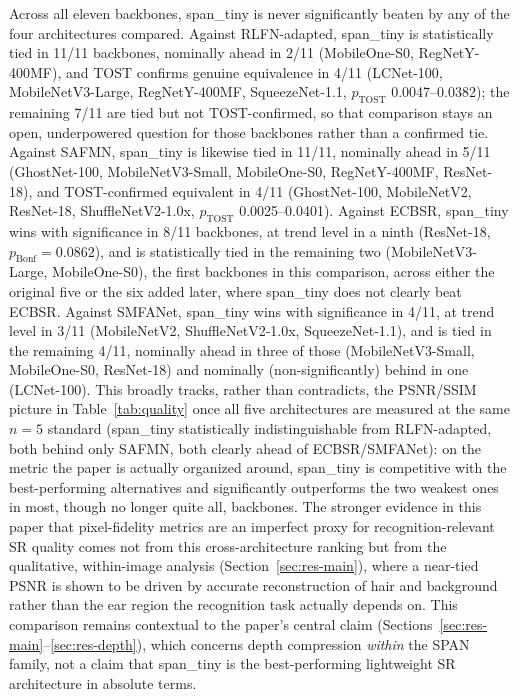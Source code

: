 \documentclass[pdflatex,sn-vancouver-num]{sn-jnl}
\begin{document}
Across all eleven backbones, span\_tiny is never significantly beaten by any of the four architectures compared. Against RLFN-adapted, span\_tiny is statistically tied in 11/11 backbones, nominally ahead in 2/11 (MobileOne-S0, RegNetY-400MF), and TOST confirms genuine equivalence in 4/11 (LCNet-100, MobileNetV3-Large, RegNetY-400MF, SqueezeNet-1.1, $p_{\text{TOST}}$ 0.0047--0.0382); the remaining 7/11 are tied but not TOST-confirmed, so that comparison stays an open, underpowered question for those backbones rather than a confirmed tie. Against SAFMN, span\_tiny is likewise tied in 11/11, nominally ahead in 5/11 (GhostNet-100, MobileNetV3-Small, MobileOne-S0, RegNetY-400MF, ResNet-18), and TOST-confirmed equivalent in 4/11 (GhostNet-100, MobileNetV2, ResNet-18, ShuffleNetV2-1.0x, $p_{\text{TOST}}$ 0.0025--0.0401). Against ECBSR, span\_tiny wins with significance in 8/11 backbones, at trend level in a ninth (ResNet-18, $p_{\text{Bonf}}{=}0.0862$), and is statistically tied in the remaining two (MobileNetV3-Large, MobileOne-S0), the first backbones in this comparison, across either the original five or the six added later, where span\_tiny does not clearly beat ECBSR. Against SMFANet, span\_tiny wins with significance in 4/11, at trend level in 3/11 (MobileNetV2, ShuffleNetV2-1.0x, SqueezeNet-1.1), and is tied in the remaining 4/11, nominally ahead in three of those (MobileNetV3-Small, MobileOne-S0, ResNet-18) and nominally (non-significantly) behind in one (LCNet-100). This broadly tracks, rather than contradicts, the PSNR/SSIM picture in Table~\ref{tab:quality} once all five architectures are measured at the same $n=5$ standard (span\_tiny statistically indistinguishable from RLFN-adapted, both behind only SAFMN, both clearly ahead of ECBSR/SMFANet): on the metric the paper is actually organized around, span\_tiny is competitive with the best-performing alternatives and significantly outperforms the two weakest ones in most, though no longer quite all, backbones. The stronger evidence in this paper that pixel-fidelity metrics are an imperfect proxy for recognition-relevant SR quality comes not from this cross-architecture ranking but from the qualitative, within-image analysis (Section~\ref{sec:res-main}), where a near-tied PSNR is shown to be driven by accurate reconstruction of hair and background rather than the ear region the recognition task actually depends on. This comparison remains contextual to the paper's central claim (Sections~\ref{sec:res-main}--\ref{sec:res-depth}), which concerns depth compression \emph{within} the SPAN family, not a claim that span\_tiny is the best-performing lightweight SR architecture in absolute terms.
\end{document}
